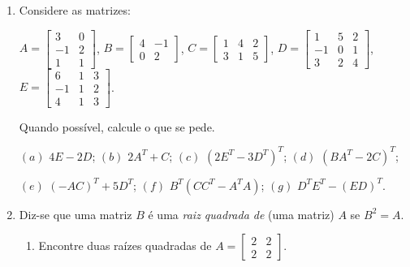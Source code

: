 \documentclass{report}
\begin{document}
\begin{Exercise}
\begin{enumerate}

\item \label{1lista10} Considere as matrizes:

$ A=\left[
\begin{array}{rr}
3 & 0 \\
-1 & 2 \\
1 & 1
\end{array}
\right]$,   $B=\left[
\begin{array}{rr}
4 & -1 \\
0 & 2
\end{array}
\right]$,  $C=\left[
\begin{array}{ccc}
1 & 4 & 2 \\
3 & 1 & 5
\end{array}
\right]$,  $D=\left[
\begin{array}{rrr}
1 & 5 & 2 \\
-1 & 0 & 1 \\
3 & 2 & 4
\end{array}
\right]$,  $E=\left[
\begin{array}{rrr}
6 & 1 & 3 \\
-1 & 1 & 2 \\
4 & 1 & 3
\end{array}
\right]$.

Quando possível, calcule o que se pede.

$(a)$ $4E-2D$; \hspace{1cm} $(b)$ $2A^{T}+C$; \hspace{1cm} $(c)$
$\left( 2E^{T}-3D^{T}\right) ^{T}$; \hspace{1cm} $(d)$ $\left(
BA^{T}-2C\right) ^{T}$;

$(e)$ $\left( -AC\right) ^{T}+5D^{T}$; \hspace{1cm} $(f)$
$B^{T}\left( CC^{T}-A^{T}A\right) $; \hspace{1cm} $(g)$
$D^{T}E^{T}-\left( ED\right) ^{T}$.


\item \label{1lista11} Diz-se que uma matriz $B$ é uma {\it raiz
quadrada de} (uma matriz) $A$ se $B^{2}=A$.

\begin{enumerate}
\item  Encontre duas raízes quadradas de $A=\left[
\begin{array}{cc}
2 & 2 \\
2 & 2
\end{array}
\right] $.


\end{enumerate}
\end{enumerate}
\end{Exercise}
\end{document}
